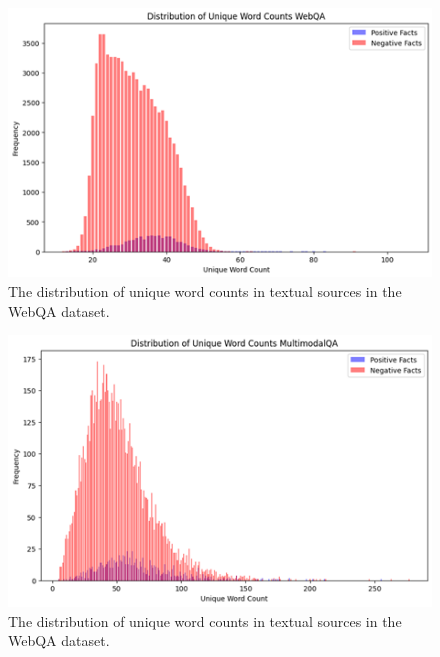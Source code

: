 \documentclass[twocolumn]{article}
\begin{document}
\begin{figure}
    \centering
    \includegraphics[width=1\linewidth]{image8.png}
    \caption{The distribution of unique word counts in textual sources in the WebQA dataset.}
    \label{fig:enter-label}
\end{figure}

\begin{figure}
    \centering
    \includegraphics[width=1\linewidth]{image9.png}
    \caption{The distribution of unique word counts in textual sources in the WebQA dataset.}
    \label{fig:enter-label}
\end{figure}
\end{document}
